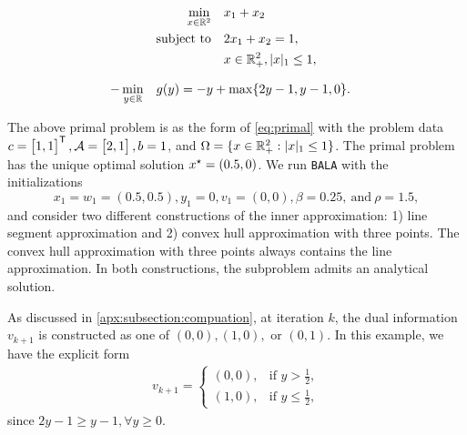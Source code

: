 \documentclass[11pt]{article}
\newcommand{\alg}{\texttt{BALA}}%
\begin{document}
\begin{minipage}{0.49\textwidth}
\begin{equation*}
       \begin{aligned}
        \min_{x \in \mathbb{R}^2} & \quad x_1 + x_2 \\\mathrm{subject~to} & \quad  2x_1 + x_2 = 1, \\
        & \quad x \in \mathbb{R}^2_+, |x|_1 \leq 1,
    \end{aligned}
\end{equation*}
\end{minipage}
\begin{minipage}{0.49\textwidth}
\begin{equation*}
    \begin{aligned}
        -\min_{y \in \mathbb{R}} & \quad g(y) = -y + \max\{ 2y - 1, y-1 , 0\}.
    \end{aligned}
\end{equation*}
\end{minipage}
The above primal problem is as the form of \eqref{eq:primal} with the problem data $c = \begin{bmatrix}
    1,1
\end{bmatrix}^{\mathsf{ T}},\mathcal{A} = \begin{bmatrix}
    2, 1
\end{bmatrix}, b = 1$, and $\Omega = \{x\in \mathbb{R}^2_+ : |x|_1 \leq 1  \}$. The primal problem has the unique optimal solution $x^\star = (0.5,0)$. 
We run \alg{} with the initializations
$$x_1 = w_1 = (0.5,0.5), y_1 = 0,v_1 = (0,0), \beta = 0.25,~\text{and}~\rho = 1.5,$$
and consider two different constructions of the inner approximation: 1) line segment approximation and 2) convex hull approximation with three points. The convex hull approximation with three points always contains the line approximation. In both constructions, the subproblem admits an analytical solution.

As discussed in \cref{apx:subsection:compuation}, at iteration $k$, the dual information $v_{k+1}$ is constructed as one of $(0,0),(1,0),$ or $(0,1)$. In this example, we have the explicit form 
\begin{align*}
    v_{k+1} = \begin{cases}
        (0,0),  & \text{if } y > \frac{1}{2}, \\ 
        (1,0),  & \text{if } y \leq  \frac{1}{2},
    \end{cases}
\end{align*}
since $2y - 1 \geq  y-1 ,\forall y \geq 0$. 
\end{document}
